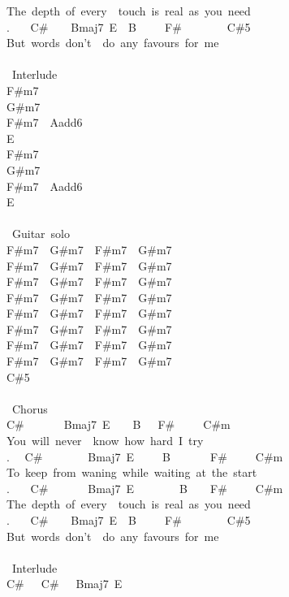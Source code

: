 {The\ depth\ of\ every\ \ touch\ is\ real\ as\ you\ need\\
. \ \ \ C\#\ \ \ \ Bmaj7\ E\ \ B\ \ \ \ \ F\#\ \ \ \ \ \ \ \ C\#5\\
But\ words\ don't\ \ do\ any\ favours\ for\ me\\
\\
\lbrack\ Interlude\rbrack\\
F\#m7\\
G\#m7\\
F\#m7\ \ Aadd6\\
E\\
F\#m7\\
G\#m7\\
F\#m7\ \ Aadd6\\
E\\
\\
\lbrack\ Guitar\ solo\rbrack\\
F\#m7\ \ G\#m7\ \ F\#m7\ \ G\#m7\\
F\#m7\ \ G\#m7\ \ F\#m7\ \ G\#m7\\
F\#m7\ \ G\#m7\ \ F\#m7\ \ G\#m7\\
F\#m7\ \ G\#m7\ \ F\#m7\ \ G\#m7\\
F\#m7\ \ G\#m7\ \ F\#m7\ \ G\#m7\\
F\#m7\ \ G\#m7\ \ F\#m7\ \ G\#m7\\
F\#m7\ \ G\#m7\ \ F\#m7\ \ G\#m7\\
F\#m7\ \ G\#m7\ \ F\#m7\ \ G\#m7\\
C\#5\\
\\
\lbrack\ Chorus\rbrack\\
C\#\ \ \ \ \ \ \ Bmaj7\ E\ \ \ \ B\ \ \ F\#\ \ \ \ \ C\#m\\
You\ will\ never\ \ know\ how\ hard\ I\ try\\
. \ \ C\#\ \ \ \ \ \ \ \ Bmaj7\ E\ \ \ \ \ B\ \ \ \ \ \ \ F\#\ \ \ \ \ C\#m\\
To\ keep\ from\ waning\ while\ waiting\ at\ the\ start\\
. \ \ \ C\#\ \ \ \ \ \ \ Bmaj7\ E\ \ \ \ \ \ \ \ B\ \ \ \ F\#\ \ \ \ \ C\#m\\
The\ depth\ of\ every\ \ touch\ is\ real\ as\ you\ need\\
. \ \ \ C\#\ \ \ \ Bmaj7\ E\ \ B\ \ \ \ \ F\#\ \ \ \ \ \ \ \ C\#5\\
But\ words\ don't\ \ do\ any\ favours\ for\ me\\
\\
\lbrack\ Interlude\rbrack\\
C\#\ \ \ C\#\ \ \ Bmaj7\ E\\
}
